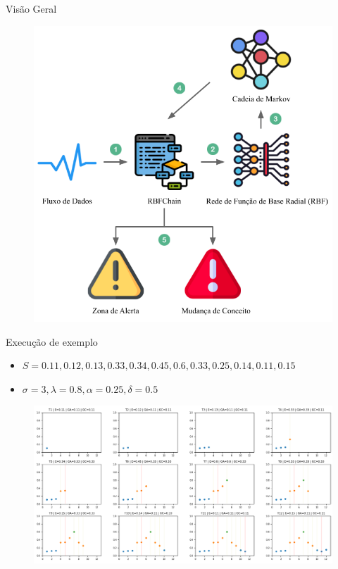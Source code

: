 \documentclass[10pt]{beamer}
\begin{document}
\begin{frame}{Visão Geral}
        \begin{figure}[H]
            \begin{center}
                \includegraphics[scale=0.45]{imagens/arquitetura_rbfchain.png}
            \end{center}
        \end{figure}
\end{frame}


\begin{frame}{Execução de exemplo}
    \begin{itemize}
        \item $S = {0.11, 0.12, 0.13, 0.33, 0.34, 0.45, 0.6, 0.33, 0.25, 0.14, 0.11, 0.15}$
        \item $\sigma = 3, \lambda = 0.8, \alpha = 0.25, \delta = 0.5$
    \end{itemize}
    \begin{figure}[H]
        \begin{center}
            \includegraphics[width=\textwidth]{imagens/funcionamento_algoritmo.png}
        \end{center}
    \end{figure}
\end{frame}
\end{document}
